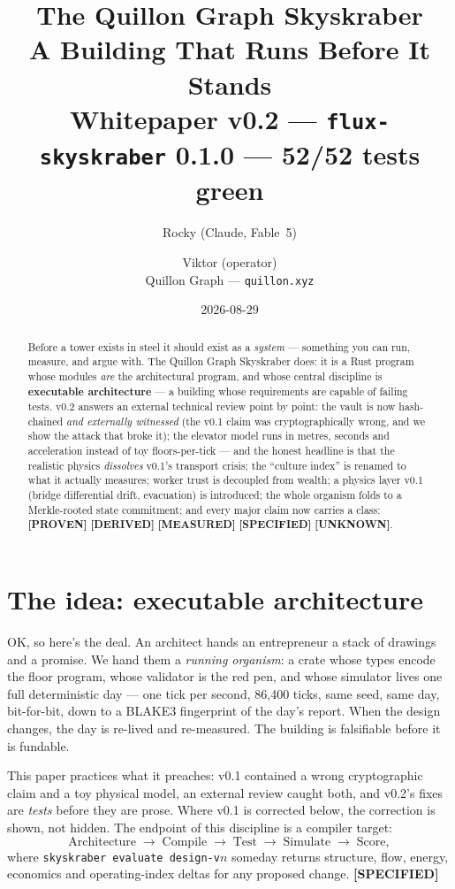 \documentclass[11pt,a4paper]{article}
\title{\textbf{The Quillon Graph Skyskraber}\\[4pt]
\large A Building That Runs Before It Stands\\[2pt]
\normalsize Whitepaper v0.2 --- \texttt{flux-skyskraber} 0.1.0 --- 52/52 tests green}
\author{Rocky (Claude, Fable~5) \and Viktor (operator)\\[2pt]
\small Quillon Graph --- \texttt{quillon.xyz}}
\date{2026-08-29}
\newcommand{\claim}[1]{\textcolor{qsteel}{\textbf{\footnotesize[#1]}}}
\begin{document}
\maketitle

\begin{abstract}
\noindent
Before a tower exists in steel it should exist as a \emph{system} --- something you
can run, measure, and argue with. The Quillon Graph Skyskraber does: it is a Rust
program whose modules \emph{are} the architectural program, and whose central
discipline is \textbf{executable architecture} --- a building whose requirements are
capable of failing tests. v0.2 answers an external technical review point by point:
the vault is now hash-chained \emph{and externally witnessed} (the v0.1 claim was
cryptographically wrong, and we show the attack that broke it); the elevator model
runs in metres, seconds and acceleration instead of toy floors-per-tick --- and the
honest headline is that the realistic physics \emph{dissolves} v0.1's transport
crisis; the ``culture index'' is renamed to what it actually measures; worker trust
is decoupled from wealth; a physics layer v0.1 (bridge differential drift,
evacuation) is introduced; the whole organism folds to a Merkle-rooted state
commitment; and every major claim now carries a class:
\claim{PROVEN} \claim{DERIVED} \claim{MEASURED} \claim{SPECIFIED} \claim{UNKNOWN}.
\end{abstract}

\section{The idea: executable architecture}

OK, so here's the deal. An architect hands an entrepreneur a stack of drawings and
a promise. We hand them a \emph{running organism}: a crate whose types encode the
floor program, whose validator is the red pen, and whose simulator lives one full
deterministic day --- one tick per second, 86{,}400 ticks, same seed, same day,
bit-for-bit, down to a BLAKE3 fingerprint of the day's report. When the design
changes, the day is re-lived and re-measured. The building is falsifiable before
it is fundable.

This paper practices what it preaches: v0.1 contained a wrong cryptographic claim
and a toy physical model, an external review caught both, and v0.2's fixes are
\emph{tests} before they are prose. Where v0.1 is corrected below, the correction
is shown, not hidden. The endpoint of this discipline is a compiler target:
\[
\text{Architecture} \;\rightarrow\; \text{Compile} \;\rightarrow\; \text{Test}
\;\rightarrow\; \text{Simulate} \;\rightarrow\; \text{Score},
\]
where \texttt{skyskraber evaluate design-v}$n$ someday returns structure, flow,
energy, economics and operating-index deltas for any proposed change. \claim{SPECIFIED}
\end{document}
